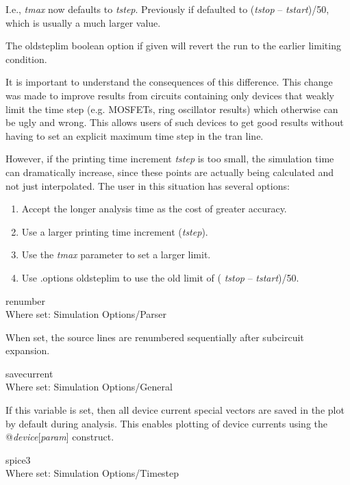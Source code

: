 \begin{description}
I.e., {\it tmax} now defaults to {\it tstep\/}.  Previously if
defaulted to ({\it tstop} -- {\it tstart\/})/50, which is usually a
much larger value.

The {\et oldsteplim} boolean option if given will revert the run to
the earlier limiting condition.

It is important to understand the consequences of this difference. 
This change was made to improve results from circuits containing only
devices that weakly limit the time step (e.g.  MOSFETs, ring
oscillator results) which otherwise can be ugly and wrong.  This
allows users of such devices to get good results without having to set
an explicit maximum time step in the tran line.

However, if the printing time increment {\it tstep} is too small, the
simulation time can dramatically increase, since these points are
actually being calculated and not just interpolated.  The user in this
situation has several options:

\begin{enumerate}
\item{Accept the longer analysis time as the cost of greater accuracy.}
\item{Use a larger printing time increment ({\it tstep\/}).}
\item{ Use the {\it tmax} parameter to set a larger limit.}
\item{Use {\vt .options oldsteplim} to use the old limit of ({\it
tstop} -- {\it tstart\/})/50.}
\end{enumerate}

\item{\et renumber}\\
Where set: {\cb Simulation Options/Parser}

When set, the source lines are renumbered sequentially after
subcircuit expansion.

\item{\et savecurrent}\\
Where set: {\cb Simulation Options/General}

If this variable is set, then all device current special vectors are
saved in the plot by default during analysis.  This enables plotting
of device currents using the {\vt @{\it device}[{\it param}]}
construct.

\item{\et spice3}\\
Where set: {\cb Simulation Options/Timestep}


\end{description}
